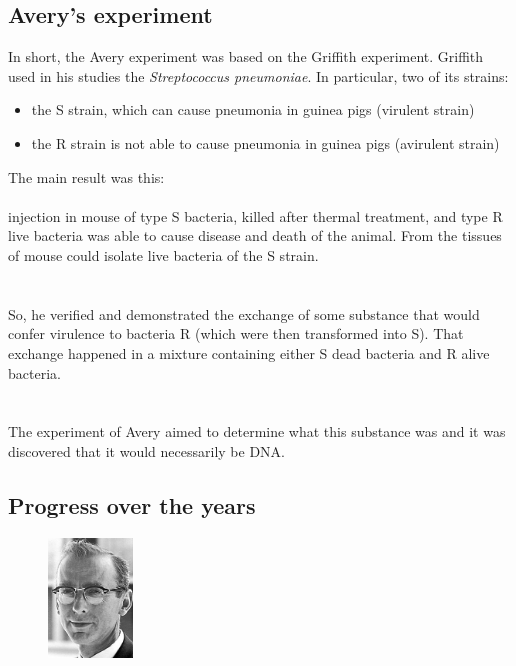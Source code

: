 \newpage

\subsection{Avery’s experiment}

In short, the Avery experiment was based on the Griffith experiment. Griffith used in his studies the \emph{Streptococcus pneumoniae}. In particular, two of its strains:

\begin{itemize}
	\item the S strain, which can cause pneumonia in guinea pigs (virulent strain)
	\item the R strain is not able to cause pneumonia in guinea pigs (avirulent strain)
\end{itemize}

The main result was this:
\\
\\injection in mouse of type S bacteria, killed after thermal treatment, and type R live bacteria was able to cause disease and death of the animal. From the tissues of mouse could isolate live bacteria of the S strain.
\\
\\
\\So, he verified and demonstrated the exchange of some substance that would confer virulence to bacteria R (which were then transformed into S). That exchange happened in a mixture containing either S dead bacteria and R alive bacteria.
\\
\\
\\The experiment of Avery aimed to determine what this substance was and it was discovered that it would necessarily be DNA. 

\subsection{Progress over the years}

\begin{figure} %
    \centering
    \includegraphics[width=0.2\textwidth]{../Images/RobertWHolley.jpg}
    \label{overflow}
\end{figure}

